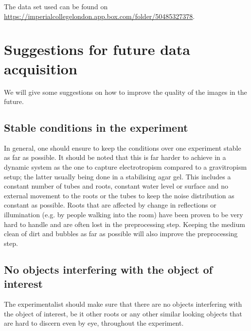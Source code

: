 The data set used can be found on \url{https://imperialcollegelondon.app.box.com/folder/50485327378}.

\section{Suggestions for future data acquisition}

We will give some suggestions on how to improve the quality of the images in the future.


\subsection{Stable conditions in the experiment}

In general, one should ensure to keep the conditions over one experiment stable as far as possible. It should be noted that this is far harder to achieve in a dynamic system as the one to capture electrotropism compared to a gravitropism setup; the latter usually being done in a stabilising agar gel. 
This includes a constant number of tubes and roots, constant water level or surface and no external movement to the roots or the tubes to keep the noise distribution as constant as possible. Roots that are affected by change in reflections or illumination (e.g. by people walking into the room) have been proven to be very hard to handle and are often lost in the preprocessing step. 
Keeping the medium clean of dirt and bubbles as far as possible will also improve the preprocessing step. 


\subsection{No objects interfering with the object of interest}

The experimentalist should make sure that there are no objects interfering with the object of interest, be it other roots or any other similar looking objects that are hard to discern even by eye, throughout the experiment.



